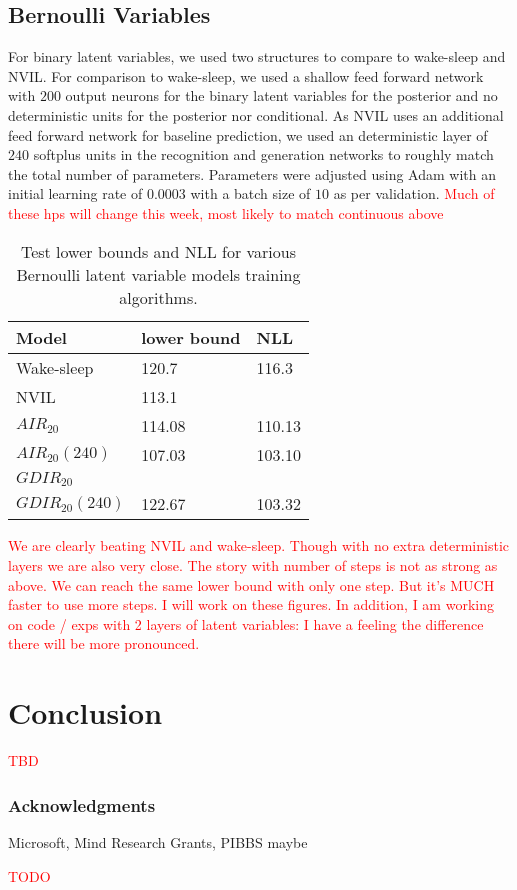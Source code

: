 \documentclass{article} %
\newcommand{\alert}[1]{\textcolor{red}{#1}}
\begin{document}
\subsection{Bernoulli Variables}
For binary latent variables, we used two structures to compare to wake-sleep and NVIL. For comparison to wake-sleep, we used a shallow feed forward network with $200$ output neurons for the binary latent variables for the posterior and no deterministic units for the posterior nor conditional. As NVIL uses an additional feed forward network for baseline prediction, we used an deterministic layer of $240$ softplus units in the recognition and generation networks to roughly match the total number of parameters. Parameters were adjusted using Adam \citep{kingma2014method} with an initial learning rate of \num{0.0003} with a batch size of $10$ as per validation. \alert{Much of these hps will change this week, most likely to match continuous above}

\begin{table}
\label{table:binary}
\begin{tabular}{ | m{6em} | m{1cm}| m{1cm} | } 
\hline
Model & lower bound & NLL \\ 
\hline
\hline
Wake-sleep & 120.7 & 116.3 \\ 
\hline
NVIL & 113.1 &  \\ 
\hline
$AIR_{20}$ & 114.08 & 110.13 \\
$AIR_{20}(240)$ & 107.03 & 103.10 \\
\hline
$GDIR_{20}$ &  &  \\
$GDIR_{20}(240)$ & 122.67  & 103.32 \\
\hline
\end{tabular}
\caption{Test lower bounds and NLL for various Bernoulli latent variable models training algorithms.}
\end{table}

\alert{We are clearly beating NVIL and wake-sleep. Though with no extra deterministic layers we are also very close. The story with number of steps is not as strong as above. We can reach the same lower bound with only one step. But it's MUCH faster to use more steps. I will work on these figures. In addition, I am working on code / exps with 2 layers of latent variables: I have a feeling the difference there will be more pronounced.}

\section{Conclusion}

\alert{TBD}


\subsubsection*{Acknowledgments}
Microsoft, Mind Research Grants, PIBBS maybe

\alert{TODO}




\end{document}
